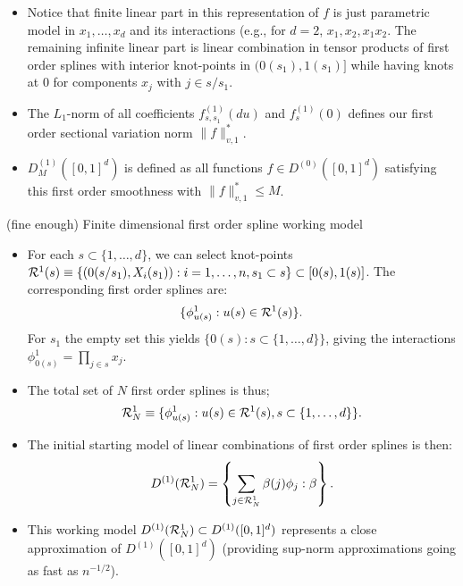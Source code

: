 \documentclass[t]{beamer}
\newlength{\wideitemsep}
\let\olditem\item
\renewcommand{\item}{\setlength{\itemsep}{\wideitemsep}\olditem}
\newcommand{\pl}{\parallel}
\begin{document}
\begin{frame}
\begin{itemize}
\item Notice that finite linear part in this representation of $f$ is just parametric model in $x_1,\ldots,x_d$ and its interactions (e.g., for $d=2$, $x_1,x_2,x_1x_2$. The remaining infinite linear part is linear combination in tensor products of first order splines with interior knot-points in $(0(s_1),1(s_1)]$ while having knots at 0 for components $x_j$ with $j\in s/s_1$.
\item The $L_1$-norm  of all coefficients $f^{(1)}_{s,s_1}(du)$ and $f^{(1)}_s(0)$ defines our first order sectional variation norm $\pl f\pl_{v,1}^*$.
\item $D^{(1)}_M([0,1]^d)$ is defined as all functions $f\in D^{(0)}([0,1]^d)$ satisfying this first order smoothness with $\pl f\pl_{v,1}^*\leq M$.
\end{itemize}
\end{frame}
\begin{frame}{(fine enough) Finite dimensional first order spline working model}
\begin{itemize}
\item For each $s\subset\{1,\ldots,d\}$, we can select knot-points
${\cal R}^1(s)\equiv  \{(0(s/s_1),X_i(s_1)): i=1,\ldots,n,s_1\subset s\}\subset [0(s),1(s)]$. The corresponding first order splines are:
\[
\{\phi^1_{u(s)}: u(s)\in {\cal R}^1(s)\}.\]
For $s_1$ the empty set this yields  $\{0(s): s\subset\{1,\ldots,d\}\}$, giving the interactions $\phi^1_{0(s)}=\prod_{j\in s}x_j$.
\item The total set of $N$ first order splines is thus;
\[
{\cal R}^1_N\equiv \{\phi^1_{u(s)}: u(s)\in {\cal R}^1(s), s\subset \{1,\ldots,d\}\}.\]
\end{itemize}
\end{frame}
\begin{frame}
\begin{itemize}
\item The initial starting model of linear combinations of first order splines is then:
\[
D^{(1)}({\cal R}^1_N)=\left\{\sum_{j\in {\cal R}^1_N}\beta(j)\phi_j: \beta\right\}.\]
\item This working model $D^{(1)}({\cal R}^1_N)\subset D^{(1)}([0,1]^d)$ represents a close approximation of $D^{(1)}([0,1]^d)$ (providing sup-norm approximations going as fast as $n^{-1/2}$).
\end{itemize}
\end{frame}
\end{document}
